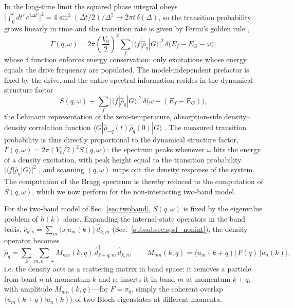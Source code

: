 \documentclass[onecolumn,aps,prl,superscriptaddress,longbibliography]{revtex4-2}
\begin{document}
In the long-time limit the squared phase integral obeys $\big|\int_0^t dt'\,e^{i\Delta t'}\big|^2 = 4\sin^2(\Delta t/2)/\Delta^2 \to 2\pi t\,\delta(\Delta)$, so the transition probability grows linearly in time and the transition rate is given by Fermi's golden rule \cite{bruusFlensberg2016},
\begin{equation}\label{eq:golden_rule}
  \Gamma(q,\omega) = 2\pi\left(\frac{V_0}{2}\right)^2 \sum_f \big|\langle f|\hat\rho_q|G\rangle\big|^2\, \delta\big(E_f-E_G-\omega\big),
\end{equation}
whose $\delta$ function enforces energy conservation: only excitations whose energy equals the drive frequency are populated. The model-independent prefactor is fixed by the drive, and the entire spectral information resides in the dynamical structure factor
\begin{equation}\label{eq:dsf_def}
  S(q,\omega) \equiv \sum_f \big|\langle f|\hat\rho_q|G\rangle\big|^2\, \delta\big(\omega-(E_f-E_G)\big),
\end{equation}
the Lehmann representation of the zero-temperature, absorption-side density--density correlation function $\langle G|\hat\rho_{-q}(t)\hat\rho_q(0)|G\rangle$ \cite{stenger1999,bruusFlensberg2016}. The measured transition probability is thus directly proportional to the dynamical structure factor, $\Gamma(q,\omega)=2\pi(V_0/2)^2 S(q,\omega)$: the spectrum peaks whenever $\omega$ hits the energy of a density excitation, with peak height equal to the transition probability $|\langle f|\hat\rho_q|G\rangle|^2$ \cite{rey2005}, and scanning $(q,\omega)$ maps out the density response of the system. The computation of the Bragg spectrum is thereby reduced to the computation of $S(q,\omega)$, which we now perform for the non-interacting two-band model.

For the two-band model of Sec.~\ref{sec:twoband}, $S(q,\omega)$ is fixed by the eigenvalue problem of $h(k)$ alone. Expanding the internal-state operators in the band basis, $\hat c_{k,s}=\sum_m\langle s|u_m(k)\rangle\,\hat d_{k,m}$ (Sec.~\ref{subsubsec:spsf_nonint}), the density operator becomes
\begin{equation}\label{eq:rho_band}
  \hat\rho_q = \sum_k\sum_{m,n=\pm} M_{mn}(k,q)\,\hat d_{k+q,m}^\dagger\,\hat d_{k,n},
  \qquad
  M_{mn}(k,q) = \langle u_m(k+q)|\,F(q)\,|u_n(k)\rangle,
\end{equation}
i.e. the density acts as a scattering matrix in band space: it removes a particle from band $n$ at momentum $k$ and re-inserts it in band $m$ at momentum $k+q$, with amplitude $M_{mn}(k,q)$---for $F=\sigma_0$, simply the coherent overlap $\langle u_m(k+q)|u_n(k)\rangle$ of two Bloch eigenstates at different momenta.
\end{document}
